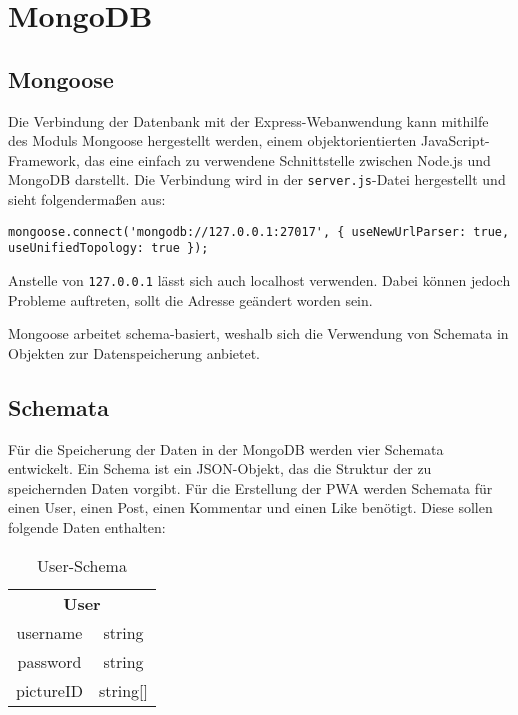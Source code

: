 \chapter{MongoDB}
\section{Mongoose}
Die Verbindung der Datenbank mit der Express-Webanwendung kann mithilfe des Moduls Mongoose hergestellt werden, einem objektorientierten JavaScript-Framework, das eine einfach zu verwendene Schnittstelle zwischen Node.js und MongoDB darstellt. Die Verbindung wird in der \texttt{server.js}-Datei hergestellt und sieht folgendermaßen aus:

\begin{lstlisting}[caption=Herstellen der Verbindung zu MongoDB, label=lst:url]
    mongoose.connect('mongodb://127.0.0.1:27017', { useNewUrlParser: true, useUnifiedTopology: true });
\end{lstlisting}

Anstelle von \texttt{127.0.0.1} lässt sich auch {localhost} verwenden. Dabei können jedoch Probleme auftreten, sollt die Adresse geändert worden sein.

Mongoose arbeitet schema-basiert, weshalb sich die Verwendung von Schemata in Objekten zur Datenspeicherung anbietet.

\section{Schemata}
Für die Speicherung der Daten in der MongoDB werden vier Schemata entwickelt. Ein Schema ist ein JSON-Objekt, das die Struktur der zu speichernden Daten vorgibt. Für die Erstellung der PWA werden Schemata für einen User, einen Post, einen Kommentar und einen Like benötigt. Diese sollen folgende Daten enthalten:


\begin{table}[!htb]
    \begin{tabularx}{\textwidth}{|c|c|}
        \cline{1-2}
        \multicolumn{2}{c}{\textbf{User}}\\
        \cline{1-2}
        username & string\\
        \cline{1-2}
        password & string\\
        \cline{1-2}
        pictureID & string[]\\
        \cline{1-2}
    \end{tabularx}
\caption{User-Schema}
\label{userschema}
\end{table}



